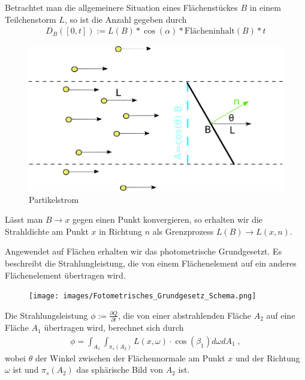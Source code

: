  Betrachtet man die allgemeinere Situation eines Flächenstückes $B$  in einem Teilchenstorm $L$, so ist die Anzahl gegeben durch 
\begin{align}
D_B([0,t]) :=L(B) * \cos(\alpha) *  \text{Flächeninhalt} (B) * t
 \end{align}
\begin{figure}[H]
    \centering
    \includegraphics[width=1.0\textwidth]{images/Strahldichte.png}
    \caption{Partikelstrom}
    \label{fig:cray}
\end{figure}

Lässt man $B \to x$ gegen einen Punkt konvergieren, so erhalten wir die Strahldichte  am Punkt $x$ in Richtung $n$ als Grenzprozess  $L(B) \to L(x, n)$.


Angewendet  auf Flächen erhalten wir das  photometrische Grundgesetzt. Es beschreibt die Strahlungleistung, die von einem  Flächenelement auf ein anderes  Flächenelement übertragen wird.

   \begin{figure}[H] 
    \centering
  
    \texttt{[image: images/Fotometrisches\_Grundgesetz\_Schema.png]}
    \label{fig:shadowmap1}
      \end{figure}
  


\begin{Satz}
Die Strahlungsleistung $\phi:= \frac{ \partial Q}{\partial t}$, die von einer abstrahlenden Fläche $A_2$  auf eine Fläche $A_1$ übertragen wird, berechnet sich durch
\begin{align}
\phi = \int_{A_1} \int_{\pi_s(A_2)} L(x, \omega)\cdot \cos(\beta_1) d\omega  dA_1   \; ,
\end{align}
wobei $\theta$ der Winkel zwischen der Flächennormale am Punkt $x$ und der Richtung $\omega$ ist und $\pi_s(A_2)$ das sphärische Bild von $A_2$ ist.
\end{Satz}

